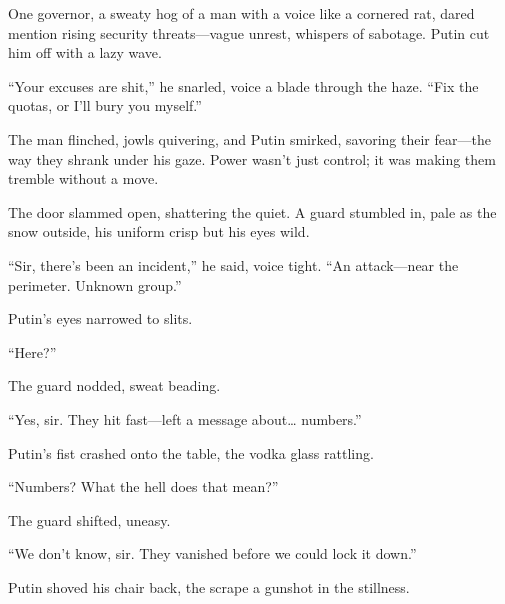 \documentclass[12pt]{book}
\begin{document}
One governor, a sweaty hog of a man with a voice like a cornered rat, dared mention rising security threats—vague unrest, whispers of sabotage. Putin cut him off with a lazy wave.

\begin{quoting}[leftmargin=1.5em, rightmargin=1em]
\enquote{Your excuses are shit,} he snarled, voice a blade through the haze. \enquote{Fix the quotas, or I'll bury you myself.}
\end{quoting}

The man flinched, jowls quivering, and Putin smirked, savoring their fear—the way they shrank under his gaze. Power wasn’t just control; it was making them tremble without a move.

The door slammed open, shattering the quiet. A guard stumbled in, pale as the snow outside, his uniform crisp but his eyes wild.

\begin{quoting}[leftmargin=1.5em, rightmargin=1em]
\enquote{Sir, there’s been an incident,} he said, voice tight. \enquote{An attack—near the perimeter. Unknown group.}
\end{quoting}

Putin’s eyes narrowed to slits.

\begin{quoting}[leftmargin=1.5em, rightmargin=1em]
\enquote{Here?}
\end{quoting}

The guard nodded, sweat beading.

\begin{quoting}[leftmargin=1.5em, rightmargin=1em]
\enquote{Yes, sir. They hit fast—left a message about\ldots{} numbers.}
\end{quoting}

Putin’s fist crashed onto the table, the vodka glass rattling.

\begin{quoting}[leftmargin=1.5em, rightmargin=1em]
\enquote{Numbers? What the hell does that mean?}
\end{quoting}

The guard shifted, uneasy.

\begin{quoting}[leftmargin=1.5em, rightmargin=1em]
\enquote{We don’t know, sir. They vanished before we could lock it down.}
\end{quoting}

Putin shoved his chair back, the scrape a gunshot in the stillness.
\end{document}
